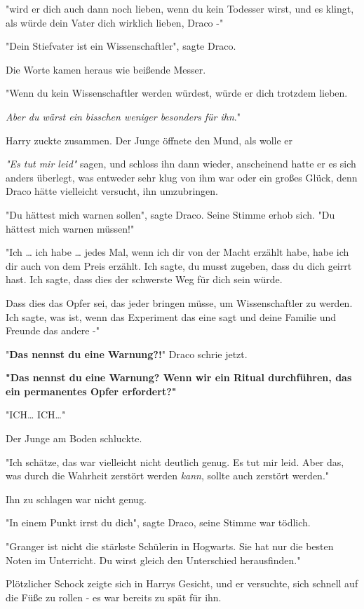 {"wird er dich auch dann noch lieben, wenn du kein Todesser wirst, und es klingt, als würde dein Vater dich wirklich lieben, Draco -"

"Dein Stiefvater ist ein Wissenschaftler", sagte Draco.

Die Worte kamen heraus wie beißende Messer.

"Wenn du kein Wissenschaftler werden würdest, würde er dich trotzdem lieben.

\emph{Aber du wärst ein bisschen weniger besonders für ihn}."

Harry zuckte zusammen. Der Junge öffnete den Mund, als wolle er

\emph{"Es tut mir leid"} sagen, und schloss ihn dann wieder, anscheinend hatte er es sich anders überlegt, was entweder sehr klug von ihm war oder ein großes Glück, denn Draco hätte vielleicht versucht, ihn umzubringen.

"Du hättest mich warnen sollen", sagte Draco. Seine Stimme erhob sich. "Du hättest mich warnen müssen!"

"Ich … ich habe … jedes Mal, wenn ich dir von der Macht erzählt habe, habe ich dir auch von dem Preis erzählt. Ich sagte, du musst zugeben, dass du dich geirrt hast. Ich sagte, dass dies der schwerste Weg für dich sein würde.

Dass dies das Opfer sei, das jeder bringen müsse, um Wissenschaftler zu werden. Ich sagte, was ist, wenn das Experiment das eine sagt und deine Familie und Freunde das andere -"

"\textbf{Das nennst du eine Warnung?!}" Draco schrie jetzt.

\textbf{"Das nennst du eine Warnung? Wenn wir ein Ritual durchführen, das ein permanentes Opfer erfordert?"}

"ICH… ICH…"

Der Junge am Boden schluckte.

"Ich schätze, das war vielleicht nicht deutlich genug. Es tut mir leid. Aber das, was durch die Wahrheit zerstört werden \emph{kann}, sollte auch zerstört werden."

Ihn zu schlagen war nicht genug.

"In einem Punkt irrst du dich", sagte Draco, seine Stimme war tödlich.

"Granger ist nicht die stärkste Schülerin in Hogwarts. Sie hat nur die besten Noten im Unterricht. Du wirst gleich den Unterschied herausfinden."

Plötzlicher Schock zeigte sich in Harrys Gesicht, und er versuchte, sich schnell auf die Füße zu rollen - es war bereits zu spät für ihn.

}
